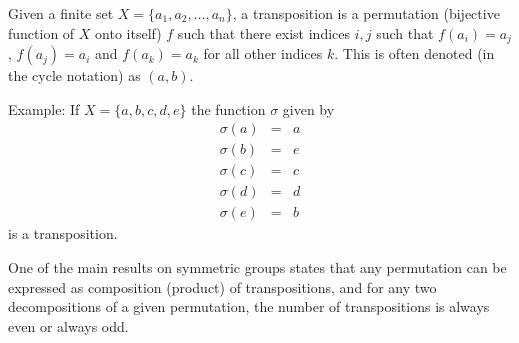 \documentclass{article}
\begin{document}
Given a finite set $X=\{a_1,a_2,\ldots,a_n\}$, a transposition is a permutation (bijective function of $X$ onto itself) $f$ such that there exist indices $i,j$ such that
$f(a_i)=a_j$, $f(a_j)=a_i$ and $f(a_k)=a_k$ for all other indices $k$. This is often denoted (in the cycle notation) as $(a, b)$.

Example:
If $X=\{a,b,c,d,e\}$ the function $\sigma$ given by
\begin{eqnarray*}
\sigma(a)&=&a\\
\sigma(b)&=&e\\
\sigma(c)&=&c\\
\sigma(d)&=&d\\
\sigma(e)&=&b
\end{eqnarray*}
is a transposition.

One of the main results on symmetric groups states that any permutation can be expressed as composition (product) of transpositions, and for any two decompositions of a given permutation, the number of transpositions is always even or always odd.
\end{document}
